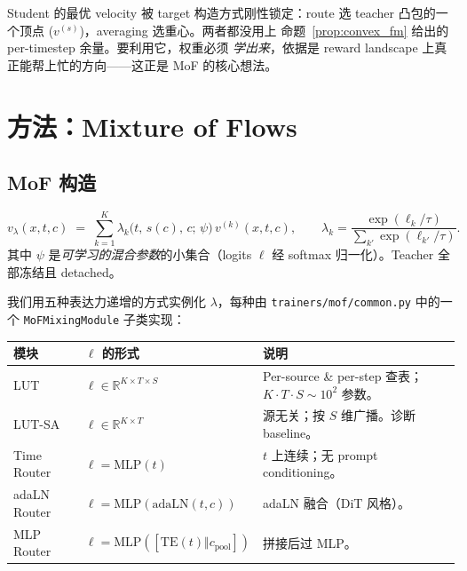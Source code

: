 \documentclass[11pt,a4paper]{article}
\newcommand{\R}{\mathbb{R}}
\theoremstyle{definition}
\begin{document}
\begin{tcolorbox}[colback=red!5,colframe=red!50,title=两种失败模式
共享同一结构性原因]
Student 的最优 velocity 被 target 构造方式刚性锁定：route 选 teacher
凸包的一个顶点 ($v^{(s)}$)，averaging 选重心。两者都没用上
命题~\ref{prop:convex_fm} 给出的 per-timestep 余量。要利用它，权重必须
\emph{学出来}，依据是 reward landscape 上真正能帮上忙的方向——这正是
MoF 的核心想法。
\end{tcolorbox}

\section{方法：Mixture of Flows}
\label{sec:method}

\subsection{MoF 构造}
\label{ssec:mof_def}

\begin{equation}
v_\lambda(x,t,c) \;=\; \sum_{k=1}^{K}
\lambda_k\!\big(t,\,s(c),\,c;\,\psi\big)\,v^{(k)}(x,t,c),
\qquad
\lambda_k = \frac{\exp(\ell_k/\tau)}{\sum_{k'}\exp(\ell_{k'}/\tau)}.
\label{eq:mof_def}
\end{equation}
其中 $\psi$ 是\emph{可学习的混合参数}的小集合（logits $\ell$ 经 softmax
归一化）。Teacher 全部冻结且 detached。

我们用五种表达力递增的方式实例化 $\lambda$，每种由
\texttt{trainers/mof/common.py} 中的一个 \texttt{MoFMixingModule}
子类实现：

\begin{center}
\renewcommand{\arraystretch}{1.3}
\footnotesize
\begin{tabular}{@{}p{2.6cm}p{4.5cm}p{4.5cm}@{}}
\toprule
\textbf{模块} & \textbf{$\ell$ 的形式} & \textbf{说明} \\
\midrule
LUT & $\ell\in\R^{K\times T\times S}$ & Per-source \& per-step 查表；$K{\cdot}T{\cdot}S\sim 10^2$ 参数。 \\
LUT-SA & $\ell\in\R^{K\times T}$ & 源无关；按 $S$ 维广播。诊断 baseline。 \\
Time Router & $\ell = \mathrm{MLP}(t)$ & $t$ 上连续；无 prompt conditioning。 \\
adaLN Router & $\ell = \mathrm{MLP}(\mathrm{adaLN}(t,c))$ & adaLN 融合（DiT 风格）。 \\
MLP Router & $\ell = \mathrm{MLP}([\mathrm{TE}(t)\Vert c_{\text{pool}}])$ & 拼接后过 MLP。 \\
\bottomrule
\end{tabular}
\end{center}
\end{document}
